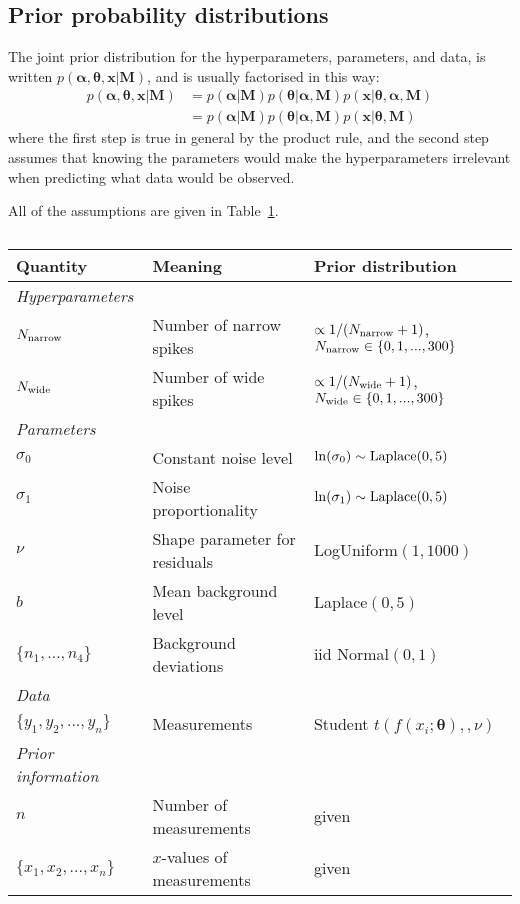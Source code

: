 \documentclass[a4paper, 12pt]{article}
\newcommand{\hypers}{\boldsymbol{\alpha}}
\newcommand{\params}{\boldsymbol{\theta}}
\newcommand{\data}{\boldsymbol{x}}
\newcommand{\info}{\boldsymbol{M}}
\begin{document}
\subsection{Prior probability distributions}

The joint prior distribution for the hyperparameters, parameters, and data,
is written $p(\hypers, \params, \data | \info)$, and is usually factorised
in this way:
\begin{align}
p(\hypers, \params, \data | \info) &=
    p(\hypers | \info)p(\params | \hypers, \info)
    p(\data | \params, \hypers, \info)\\
    &= p(\hypers | \info)p(\params | \hypers, \info)
    p(\data | \params, \info)
\end{align}
where the first step is true in general by the product rule, and the second
step assumes that knowing the parameters would make the hyperparameters
irrelevant when predicting what data would be observed.

All of the assumptions are given in Table~\ref{tab:priors}.

\begin{table}
\centering
\begin{tabular}{|lll|}
\hline
{\bf Quantity}      &   {\bf Meaning}   &  {\bf Prior distribution}\\
\hline
{\em Hyperparameters} & &\\
$N_{\rm narrow}$   &   Number of narrow spikes    &  $\propto 1/(N_{\rm narrow}+1)$, $N_{\rm narrow} \in \{0, 1, ..., 300\}$ \\
$N_{\rm wide}$   &   Number of wide spikes    &  $\propto 1/(N_{\rm wide}+1)$,
$N_{\rm wide} \in \{0, 1, ..., 300\}$ \\

\hline
{\em Parameters}& &\\
$\sigma_0$ &    Constant noise level  &   $\ln(\sigma_0) \sim \textnormal{Laplace}(0,5)$\\
$\sigma_1$ &    Noise proportionality   &  $\ln(\sigma_1) \sim \textnormal{Laplace}(0,5)$ \\
$\nu$     &   Shape parameter for residuals   &   LogUniform$(1, 1000)$\\
$b$       & Mean background level       & Laplace$(0, 5)$\\
$\{n_1, ..., n_4\}$  & Background deviations & iid Normal$(0,1)$\\
\hline
{\em Data}&&\\
\hline
$\{y_1, y_2, ..., y_n\}$  &   Measurements    & Student $t(f(x_i; \params), ,\nu)$\\
\hline
{\em Prior information}&&\\
\hline
$n$ & Number of measurements & given\\
$\{x_1, x_2, ..., x_n\}$  & $x$-values of measurements & given \\
\hline
\end{tabular}
\caption{\label{tab:priors}}
\end{table}
\end{document}
